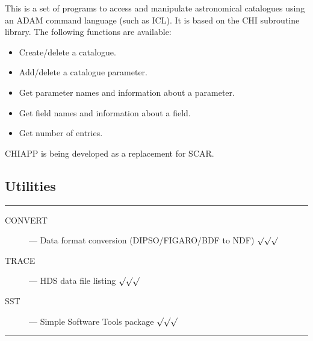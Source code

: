 \begin{description}
This is a set of programs to access and manipulate astronomical catalogues
using an ADAM command language (such as ICL).
It is based on the CHI subroutine library.
The following functions are available:
\begin{itemize}
\item Create/delete a catalogue.
\item Add/delete a catalogue parameter.
\item Get parameter names and information about a parameter.
\item Get field names and information about a field.
\item Get number of entries.
\end{itemize}
CHIAPP is being developed as a replacement for SCAR.

\end{description}

\newpage

\subsection{Utilities}

\rule{\textwidth}{0.5mm}
\begin{description}
\begin{description}
\item [CONVERT] --- Data format conversion (DIPSO/FIGARO/BDF to NDF) \hfill 
 $\surd\surd\surd$
\item [TRACE] --- HDS data file listing \hfill $\surd\surd\surd$
\item [SST] --- Simple Software Tools package \hfill $\surd\surd\surd$
\end{description}
\end{description}
\rule{\textwidth}{0.5mm}

